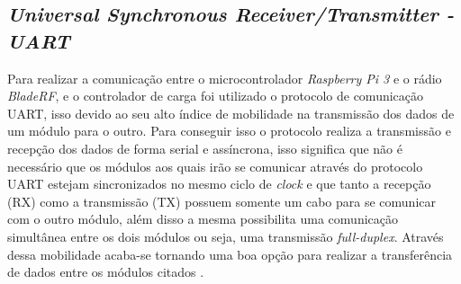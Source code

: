 \subsection{\emph{Universal Synchronous Receiver/Transmitter - UART}}
    Para realizar a comunicação entre o microcontrolador \emph{Raspberry Pi 3} e o rádio \emph{BladeRF}, e o controlador de carga foi utilizado o protocolo de comunicação UART, isso devido ao seu alto índice de mobilidade na transmissão dos dados de um módulo para o outro. Para conseguir isso o protocolo realiza a transmissão e recepção dos dados de forma serial e assíncrona, isso significa que não é necessário que os módulos aos quais irão se comunicar através do protocolo UART estejam sincronizados no mesmo ciclo de \emph{clock} e que tanto a recepção (RX) como a transmissão (TX) possuem somente um cabo para se comunicar com o outro módulo, além disso a mesma possibilita uma comunicação simultânea entre os dois módulos ou seja, uma transmissão \emph{full-duplex}. Através dessa mobilidade acaba-se tornando uma boa opção para realizar a transferência de dados entre os módulos citados \cite{uart}.
